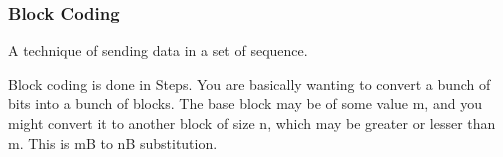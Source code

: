 \documentclass[11pt]{article}
\begin{document}
\subsubsection{Block Coding}
A technique of sending data in a set of sequence. 

Block coding is done in Steps. You are basically wanting to convert a bunch of bits into a bunch of blocks. The base block may be of some value m, and you might convert it to another block of size n, which may be greater or lesser than m. This is mB to nB substitution. 
\end{document}
